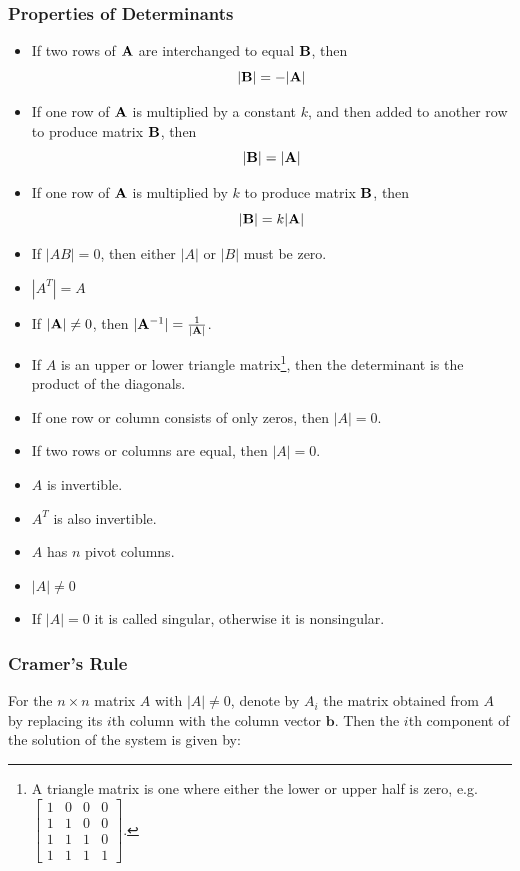         \subsubsection{Properties of Determinants}
        \begin{itemize}
        \item If two rows of $\mathbf{A}$ are interchanged to equal $\mathbf{B}$, then
            \[ | \mathbf{B} | = - | \mathbf{A} | \]
        \item If one row of $\mathbf{A}$ is multiplied by a constant $k$, and then added to another row to produce matrix $\mathbf{B}$, then
            \[ | \mathbf{B} | = | \mathbf{A} | \]
        \item If one row of $\mathbf{A}$ is multiplied by $k$ to produce matrix $\mathbf{B}$, then
            \[ | \mathbf{B} | = k | \mathbf{A} | \]
        \item If $|AB| = 0$, then either $|A|$ or $|B|$ must be zero.
        \item $|A^T| = A$
        \item If $| \mathbf{A} | \neq 0$, then $| \mathbf{A}^{-1} | = \frac{1}{|\mathbf{A} |}$.
        \item If $A$ is an upper or lower triangle matrix\footnote{A triangle matrix is one where either the lower or upper half is zero, e.g. $\left[\begin{array}{cccc}1 & 0 & 0 & 0\\1 & 1 & 0 & 0\\1 & 1 & 1 & 0\\1 & 1 & 1 & 1\end{array}\right]$.}, then the determinant is the product of the diagonals.
        \item If one row or column consists of only zeros, then $|A| = 0$.
        \item If two rows or columns are equal, then $|A|=0$.
        \item $A$ is invertible.
        \item $A^T$ is also invertible.
        \item $A$ has $n$ pivot columns.
        \item $|A| \neq 0$
        \item If $|A| = 0$ it is called singular, otherwise it is nonsingular.
        \end{itemize}

        \subsubsection{Cramer's Rule}
        For the $n \times n$ matrix $A$ with $|A| \neq 0$, denote by $A_i$ the matrix obtained from $A$ by replacing its $i$th column with the column vector $\mathbf{b}$. Then the $i$th component of the solution of the system is given by:

